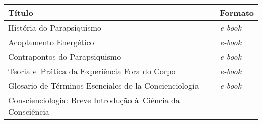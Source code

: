 \documentclass{gescons}
\begin{document}
\begin{longtable}[]{@{}
  >{\raggedright\arraybackslash}p{}
  >{\raggedright\arraybackslash}p{}@{}}
\toprule\noalign{}
\begin{minipage}[b]{\linewidth}\centering
\textbf{Título}
\end{minipage} & \begin{minipage}[b]{\linewidth}\centering
\textbf{Formato}
\end{minipage} \\
\hline
\begin{minipage}[b]{\linewidth}\raggedright
História do Parapsiquismo
\end{minipage} & \begin{minipage}[b]{\linewidth}\centering
\emph{e-book}
\end{minipage} \\
\hline
\begin{minipage}[b]{\linewidth}\raggedright
Acoplamento Energético
\end{minipage} & \begin{minipage}[b]{\linewidth}\centering
\emph{e-book}
\end{minipage} \\
\hline
\begin{minipage}[b]{\linewidth}\raggedright
Contrapontos do Parapsiquismo
\end{minipage} & \begin{minipage}[b]{\linewidth}\centering
\emph{e-book}
\end{minipage} \\
\hline
\begin{minipage}[b]{\linewidth}\raggedright
Teoria e~Prática da Experiência Fora do Corpo
\end{minipage} & \begin{minipage}[b]{\linewidth}\centering
\emph{e-book}
\end{minipage} \\
\hline
\begin{minipage}[b]{\linewidth}\raggedright
Glosario de Términos Esenciales de la Concienciología
\end{minipage} & \begin{minipage}[b]{\linewidth}\centering
\emph{e-book}
\end{minipage} \\
\hline
\begin{minipage}[b]{\linewidth}\raggedright
Conscienciologia: Breve Introdução à~Ciência da Consciência

\end{minipage}
\end{longtable}
\end{document}
